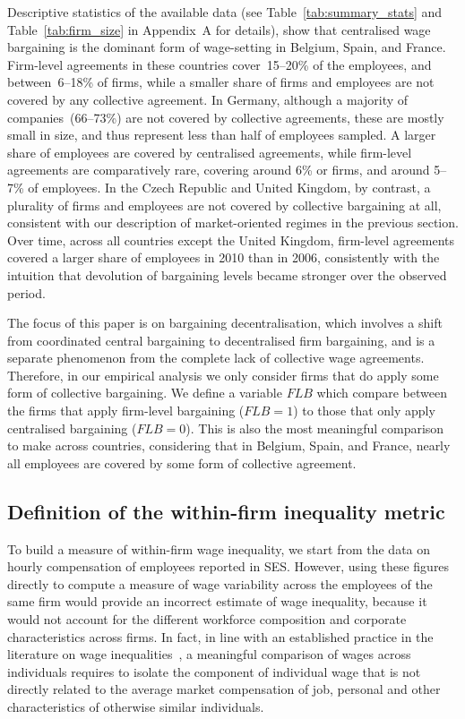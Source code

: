 \documentclass[12pt]{article}
\begin{document}
Descriptive statistics of the available data (see Table~\ref{tab:summary_stats} and Table~\ref{tab:firm_size} in Appendix~A for details), show that centralised wage bargaining is the dominant form of wage-setting in Belgium, Spain, and France. Firm-level agreements in these countries cover~15--20\% of the employees, and between~6--18\% of firms, while a smaller share of firms and employees are not covered by any collective agreement. In Germany, although a majority of companies~(66--73\%) are not covered by collective agreements, these are mostly small in size, and thus represent less than half of employees sampled. A larger share of employees are covered by centralised agreements, while firm-level agreements are comparatively rare, covering around 6\% or firms, and around 5--7\% of employees. In the Czech Republic and United Kingdom, by contrast, a plurality of firms and employees are not covered by collective bargaining at all, consistent with our description of market-oriented regimes in the previous section. 
Over time, across all countries except the United Kingdom, firm-level agreements covered a larger share of employees in 2010 than in 2006, consistently with the intuition that devolution of bargaining levels became stronger over the observed period.

The focus of this paper is on bargaining decentralisation, which involves a shift from coordinated central bargaining to decentralised firm bargaining, and is a separate phenomenon from the complete lack of collective wage agreements. Therefore, in our empirical analysis we only consider firms that do apply some form of collective bargaining. We define a variable $\mathit{FLB}$ which compare between the firms that apply firm-level bargaining ($\mathit{FLB}=1$) to those that only apply centralised bargaining ($\mathit{FLB}=0$).
This is also the most meaningful comparison to make across countries, considering that in Belgium, Spain, and France, nearly all employees are covered by some form of collective agreement.


\subsection{Definition of the within-firm inequality metric}
To build a measure of within-firm wage inequality, we start from the data on hourly compensation of employees reported in SES. However, using these figures directly to compute a measure of wage variability across the employees of the same firm would provide an incorrect estimate of wage inequality, because it would not account for the different workforce composition and corporate characteristics across firms. In fact, in line with an established practice in the literature on wage inequalities~\citep[dating at least since][]{winter.ebmer.1999}, a meaningful comparison of wages across individuals requires to isolate the component of individual wage that is not directly related to the average market compensation of job, personal and other characteristics of otherwise similar individuals.
\end{document}
